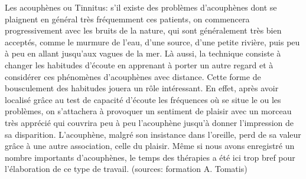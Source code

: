 Les acouphènes ou Tinnitus: 
s'il existe des problèmes d'acouphènes dont se plaignent en général très fréquemment ces patients, on 
commencera progressivement avec les bruits 
de la nature, qui sont généralement très bien acceptés, comme le murmure de l'eau, d'une source, d'une 
petite rivière, puis peu à peu  en allant jusqu'aux vagues de la mer. Là aussi, la technique consiste à 
changer les habitudes d'écoute en apprenant à porter un autre regard et  à  
considérer ces phénomènes d'acouphènes avec distance. Cette forme de bousculement des habitudes  
jouera un rôle intéressant. En effet, après avoir localisé grâce au test de capacité d'écoute les 
fréquences où se situe le ou les problèmes, on s'attachera à provoquer un sentiment de plaisir avec un 
morceau très apprécié qui couvrira peu à peu l'acouphène jusqu'à donner l'impression de sa 
disparition. L'acouphène, malgré son insistance dans l'oreille, perd de sa valeur grâce à une autre 
association, celle du plaisir. Même si nous avons enregistré un nombre importants d'acouphènes, le 
temps des thérapies a été ici trop bref pour l'élaboration de ce type de travail. (sources: formation A. 
Tomatis)



